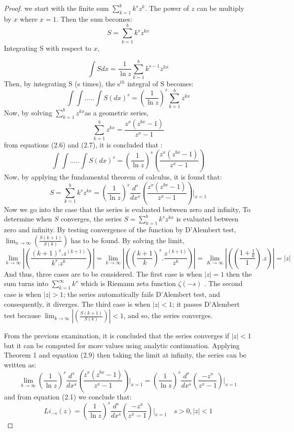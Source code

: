 \documentclass{amsart}
\numberwithin{equation}{section}
\newcommand{\beq}{\begin{equation}}
\newcommand{\eeq}{\end{equation}}
\begin{document}
\begin{proof} 
we start with the finite sum $\sum_{k=1}^{b} k^{s}z^{k}$.
The power of $z$ can be multiply by $ x$ where $x = 1$. Then the sum becomes:
\beq
S = \sum_{k=1}^{b} k^{s}z^{kx}
\label{8}
\eeq
Integrating S with respect to $x$,

\beq
\int S dx=\frac{1}{\ln z}\sum_{k=1}^{b}k^{s-1}z^{kx}
\label{9}
\eeq
Then, by integrating S (s times), the s$^{th}$ integral of S becomes:
\beq
\int \int .....\int S (dx)^{s}=(\frac{1}{\ln z})^{s}\sum_{k=1}^{b}z^{kx}
\label{10}
\eeq
Now, by solving $\sum_{k=1}^{b}z^{kx}$as a geometric series,
\beq
\sum_{k=1}^{b}z^{kx}=\frac{z^x(z^{bx}-1)}{z^x-1}
\label{11}
\eeq
from equations (2.6) and (2.7), it is concluded that :
\beq
\int \int .....\int S (dx)^{s} = (\frac{1}{\ln z})^{s}(\frac{z^x(z^{bx}-1)}{z^x-1})
\label{12}
\eeq
Now, by applying the fundamental theorem of calculus, it is found that:
\beq
S = \sum_{k=1}^{b} k^{s}z^{kx} =  (\frac{1}{\ln z})^{s}\frac{d^s}{dx^s}(\frac{z^x(z^{bx}-1)}{z^x-1})\bigg|_{x=1}
\eeq
Now we go into the case that the series is evaluated between zero and
	infinity, To determine
	when $S$ converges, the series $S=\sum_{k=1}^{b} k^{s}z^{kx}$ is evaluated between zero and infinity. By testing convergence of the function by D’Alembert test, $\lim_{n \to \infty }(\frac{S(k+1)}{S(k)})$ has to be found. By solving the
	limit,
\beq
\lim_{k\to \infty} \left |(\frac{(k+1)^{s}.z^{(k+1)}}{k^{s}.z^{k}})  \right |=\lim_{k\to \infty}\left |((\frac{k+1}{k})^s .\frac{z^{(k+1)}}{z^{k}})  \right |=\lim_{K\to \infty}\left |((\frac{1+\frac{1}{k}}{1}) . z)  \right | = \left | z \right |
\eeq
And thus, three cases are to be considered. The first case is when $\left | z \right |=1$ then the sum turns into $\sum_{k=1}^{\infty} k^{s}$ which is Riemann zeta function $\zeta (-s)$ \cite{zeta}. The second case is when $\left | z \right |>1$; the series automatically
fails D’Alembert test, and consequently, it diverges. The third case is when $\left | z \right |<1$; it passes D’Alembert test because $\lim_{k \to \infty }\left |(\frac{S(k+1)}{S(k)})\right |<1$, and so, the series converges.
	
From the previous examination, it is concluded that the series converges if $\left | z \right |<1$ but it can be computed  for more values using analytic continuation\cite{wolf}. Applying Theorem 1 and equation (2.9) then taking the limit at infinity, the series can be written as:
\beq
\lim_{b\to \infty} (\frac{1}{\ln z})^{s}\frac{d^s}{dx^s}(\frac{z^x(z^{bx}-1)}{z^x-1})\bigg|_{x=1}=(\frac{1}{\ln z})^{s}\frac{d^s}{dx^s}(\frac{-z^x}{z^x-1})\bigg|_{x=1}
\eeq
and from equation (2.1) we conclude that:
\beq
Li_{-s}(z) = (\frac{1}{\ln z})^{s}\frac{d^s}{dx^s}(\frac{-z^x}{z^x-1})\bigg|_{x=1} \quad s>0,  \left | z \right |<1
\eeq
\end{proof}
\end{document}
